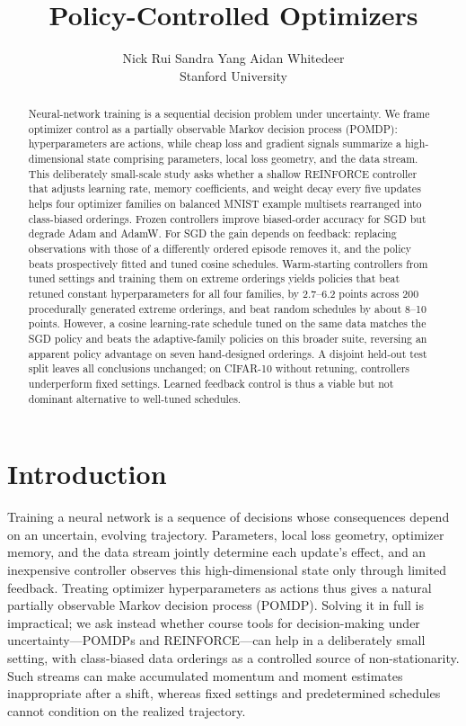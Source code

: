 \documentclass{article}
\title{Policy-Controlled Optimizers}
\author{Nick Rui \And Sandra Yang \And Aidan Whitedeer\\
Stanford University}
\begin{document}
\maketitle
\begin{abstract}
Neural-network training is a sequential decision problem under uncertainty. We frame optimizer control as a partially observable Markov decision process (POMDP): hyperparameters are actions, while cheap loss and gradient signals summarize a high-dimensional state comprising parameters, local loss geometry, and the data stream. This deliberately small-scale study asks whether a shallow REINFORCE controller that adjusts learning rate, memory coefficients, and weight decay every five updates helps four optimizer families on balanced MNIST example multisets rearranged into class-biased orderings. Frozen controllers improve biased-order accuracy for SGD but degrade Adam and AdamW. For SGD the gain depends on feedback: replacing observations with those of a differently ordered episode removes it, and the policy beats prospectively fitted and tuned cosine schedules. Warm-starting controllers from tuned settings and training them on extreme orderings yields policies that beat retuned constant hyperparameters for all four families, by 2.7--6.2 points across 200 procedurally generated extreme orderings, and beat random schedules by about 8--10 points. However, a cosine learning-rate schedule tuned on the same data matches the SGD policy and beats the adaptive-family policies on this broader suite, reversing an apparent policy advantage on seven hand-designed orderings. A disjoint held-out test split leaves all conclusions unchanged; on CIFAR-10 without retuning, controllers underperform fixed settings. Learned feedback control is thus a viable but not dominant alternative to well-tuned schedules.
\end{abstract}

\section{Introduction}
Training a neural network is a sequence of decisions whose consequences depend on an uncertain, evolving trajectory. Parameters, local loss geometry, optimizer memory, and the data stream jointly determine each update's effect, and an inexpensive controller observes this high-dimensional state only through limited feedback. Treating optimizer hyperparameters as actions thus gives a natural partially observable Markov decision process (POMDP). Solving it in full is impractical; we ask instead whether course tools for decision-making under uncertainty---POMDPs and REINFORCE---can help in a deliberately small setting, with class-biased data orderings as a controlled source of non-stationarity. Such streams can make accumulated momentum and moment estimates inappropriate after a shift, whereas fixed settings and predetermined schedules cannot condition on the realized trajectory.
\end{document}
